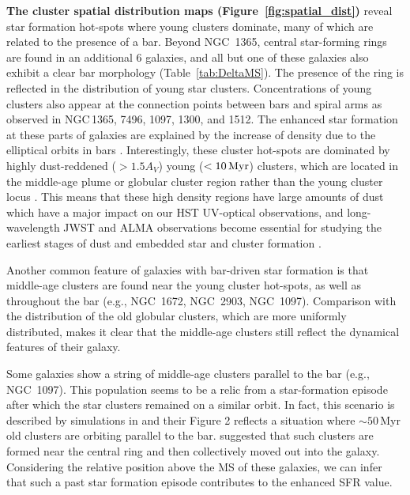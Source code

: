 \documentclass[linenumbers]{aastex63}
\begin{document}
\textbf{The cluster spatial distribution maps (Figure~\ref{fig:spatial_dist})} reveal star formation hot-spots where young clusters dominate, many of which are related to the presence of a bar. Beyond NGC~1365, central star-forming rings are found in an additional 6 galaxies, and all but one of these galaxies also exhibit 
a clear bar morphology (Table~\ref{tab:DeltaMS}).  The presence of the ring is reflected in the distribution of young star clusters.
Concentrations of young clusters also appear at the connection points between bars and spiral arms as observed in NGC\,1365, 7496, 1097, 1300, and 1512. The enhanced star formation at these parts of galaxies are explained by the increase of density due to the elliptical orbits in bars \citep[e.g.][]{nguyen_luong_w43_2011,beuther_interactions_2017,tress_simulations_2020,sormani_simulations_2020,levy_morpho-kinematic_2022}. 
Interestingly, these cluster hot-spots are dominated by highly dust-reddened ($>1.5 A_V$) young ($<{\rm 10\,Myr}$) clusters, which are located in the middle-age plume or globular cluster region rather than the young cluster locus \citep{whitmore_improving_2023, thilker23sed}. This means that these high density regions have large amounts of dust which have a major impact on our HST UV-optical observations, and long-wavelength JWST and ALMA observations become essential for studying the earliest stages of dust and embedded star and cluster formation \citep[e.g.][]{johnson_physical_2015, leroy_phangs-alma_2021, emig_super_2020,rico-villas_super_2020, costa_toward_2021, levy_outflows_2021, levy_morpho-kinematic_2022, schinnerer_phangs-jwst_2023, whitmore_phangs-jwst_2023, linden_goals-jwst_2023, sun_hidden_2024}.

Another common feature of galaxies with bar-driven star formation is that middle-age clusters are found near the young cluster hot-spots, as well as throughout the bar (e.g., NGC~1672, NGC~2903, NGC~1097).  Comparison with the distribution of the old globular clusters, which are more uniformly distributed, makes it clear that the middle-age clusters still reflect the dynamical features of their galaxy.

Some galaxies show a string of middle-age clusters parallel to the bar (e.g., NGC~1097). This population seems to be a relic from a star-formation episode after which the star clusters remained on a similar orbit. In fact, this scenario is described by simulations in \citet{dobbs_age_2010} and their Figure 2 reflects a situation where $\sim50$\,Myr old clusters are orbiting parallel to the bar. \citet{sormani_simulations_2020} suggested that such clusters are formed near the central ring and then collectively moved out into the galaxy. Considering the relative position above the MS of these galaxies, we can infer that such a past star formation episode contributes to the enhanced SFR value.
\end{document}
